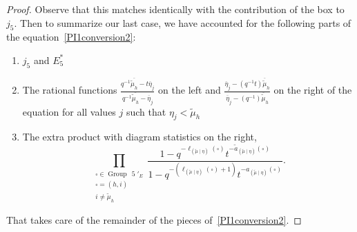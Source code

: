\documentclass[ALCO]{cedram}
\newcommand{\mutilde}{{\widetilde{\mu}}}
\newcommand{\mutildeeta}{{(\mutilde \mid \eta)}}
\newcommand{\leg}[1]{{\ell_{#1}(\square)}}
\newcommand{\armone}[1]{{\widetilde{a}_{#1}(\square)}}
\newcommand{\armtwo}[1]{{a_{#1}(\square)}}
\newcommand{\group}[1]{\operatorname{Group}\,\operatorname{#1}}
\newcommand{\jfive}{j_5}
\newcommand{\Estarfive}{E^*_5}
\begin{document}
\begin{proof}
Observe that this matches identically with the contribution of the box to $\jfive$. Then to summarize our last case, we have accounted for the following parts of the equation~\eqref{PI1conversion2}:
\begin{enumerate}
    \item $j_5$ and $\Estarfive$
    \item The rational functions $\displaystyle{ \frac{q^{-1} \overline{\mutilde_h} -t\overline{\eta}_j}{q^{-1} \overline{\mutilde_h} -\overline{\eta}_j}}$ on the left and $\displaystyle{\frac{\overline{\eta}_j- (q^{-1}t)\overline{\mutilde}_h}{\overline{\eta}_j- (q^{-1})\overline{\mutilde}_h}}$ on the right of the equation for all values $j$ such that $\eta_j < \mutilde_h$
    \item The extra product with diagram statistics on the right, 
    \[\prod\limits_{\substack{\square \in \group{5}'_E \\ \square = (h,i) \\ i\neq \mutilde_h}} \frac{1-q^{-\leg{\mutildeeta}}t^{-\armone{\mutildeeta}}}{1-q^{-(\leg{\mutildeeta}+1)}t^{-\armtwo{\mutildeeta}}}.\]
\end{enumerate}
That takes care of the remainder of the pieces of~\eqref{PI1conversion2}. \qedhere
\end{proof}





\end{document}
